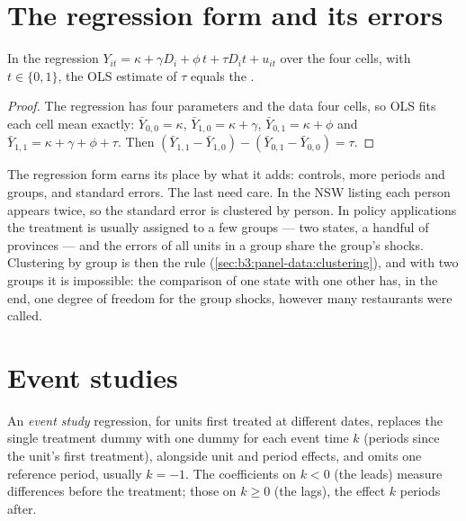 \section{The regression form and its errors}\label{sec:b3:difference-in-differences:regression}

\begin{proposition}\label{prop:b3:difference-in-differences:regression}
In the regression $Y_{it} = \kappa + \gamma D_i + \phi\, t + \tau D_i t + u_{it}$
over the four cells, with $t \in \{0, 1\}$, the OLS estimate of $\tau$ equals
the .
\end{proposition}

\begin{proof}
The regression has four parameters and the data four cells, so OLS fits each
cell mean exactly: $\bar Y_{0,0} = \kappa$, $\bar Y_{1,0} = \kappa + \gamma$,
$\bar Y_{0,1} = \kappa + \phi$ and $\bar Y_{1,1} = \kappa + \gamma +
\phi + \tau$. Then $(\bar Y_{1,1} - \bar Y_{1,0}) - (\bar Y_{0,1} - \bar
Y_{0,0}) = \tau$.
\end{proof}

The regression form earns its
place by what it adds: controls, more periods and groups, and standard errors.
The last need care. In the NSW listing each person appears twice, so the
standard error is clustered by person. In policy applications the treatment is
usually assigned to a few groups --- two states, a handful of provinces --- and
the errors of all units in a group share the group's shocks. Clustering by group
is then the rule (\cref{sec:b3:panel-data:clustering}), and with two groups it
is impossible: the comparison of one state with one other has, in the end, one
degree of freedom for the group shocks, however many restaurants were called.

\section{Event studies}\label{sec:b3:difference-in-differences:event-study}

\begin{definition}\label{def:b3:difference-in-differences:event-study}
An \emph{event study} regression, for units first treated at different dates,
replaces the single treatment dummy with one dummy for each event time $k$
(periods since the unit's first treatment), alongside unit and period effects,
and omits one reference period, usually $k = -1$. The coefficients on $k < 0$
(the leads) measure differences before the treatment; those on $k \ge 0$ (the
lags), the effect $k$ periods after.
\end{definition}

